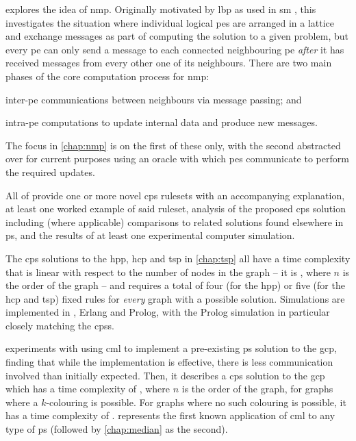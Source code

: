  explores the idea of \gls{nmp}.  Originally motivated by \gls{lbp} \cite{Sun2003,Felzenszwalb2006,Felzenszwalb2011} as used in \gls{sm} \cite{Sinha2020,Tippetts2016,Scharstein2002}, this  investigates the situation where individual logical \glspl{pe} are arranged in a lattice and exchange messages as part of computing the solution to a given problem, but every \gls{pe} can only send a message to each connected neighbouring \gls{pe} \emph{after} it has received messages from every other one of its neighbours.  There are two main phases of the core computation process for \gls{nmp}:
\begin{inparaenum}[a)]
\item inter-\gls{pe} communications between neighbours via message passing; and
\item intra-\gls{pe} computations to update internal data and produce new messages.
\end{inparaenum}  The focus in \cref{chap:nmp} is on the first of these only, with the second abstracted over for current purposes using an oracle with which \glspl{pe} communicate to perform the required updates.

All of  provide one or more novel \gls{cps} \glspl{ruleset} with an accompanying explanation, at least one worked example of said \gls{ruleset}, analysis of the proposed \gls{cps} solution including (where applicable) comparisons to related solutions found elsewhere in \gls{ps}, and the results of at least one experimental computer simulation.

The \gls{cps} solutions to the \gls{hpp}, \gls{hcp} and \gls{tsp} in \cref{chap:tsp} all have a time complexity that is linear with respect to the number of nodes in the graph -- \ie{} it is , where \(n\) is the order of the graph -- and requires a total of four (for the \gls{hpp}) or five (for the \gls{hcp} and \gls{tsp}) fixed rules for \emph{every} graph with a possible solution.  Simulations are implemented in \fsharp{}, Erlang and Prolog, with the Prolog simulation in particular closely matching the \glspl{cps}.

 experiments with using \gls{cml} to implement a pre-existing \gls{ps} solution to the \gls{gcp}, finding that while the implementation is effective, there is less communication involved than initially expected.  Then, it describes a \gls{cps} solution to the \gls{gcp} which has a time complexity of , where \(n\) is the order of the graph, for graphs where a \(k\)-colouring is possible.  For graphs where no such colouring is possible, it has a time complexity of .   represents the first known application of \gls{cml} to any type of \gls{ps} (followed by \cref{chap:median} as the second).

